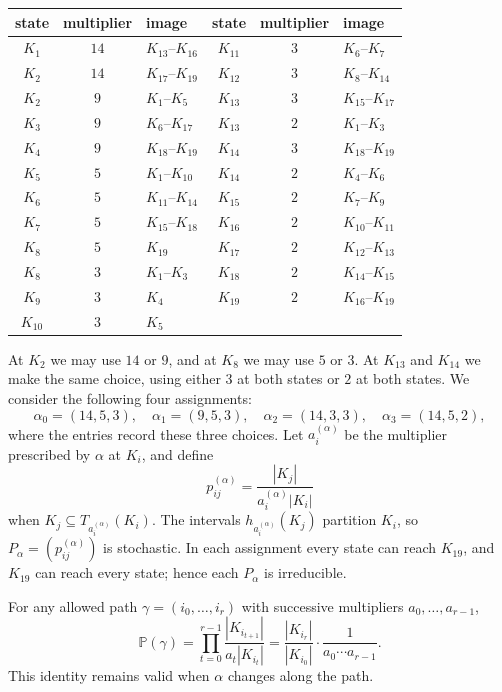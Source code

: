 \documentclass[11pt]{article}
\begin{document}
\begin{center}
\small
\begin{tabular}{ccl@{\qquad}ccl}
\toprule
state & multiplier & image & state & multiplier & image \\
\midrule
$K_1$ & $14$ & $K_{13}\text{--}K_{16}$ & $K_{11}$ & $3$ & $K_6\text{--}K_7$ \\
$K_2$ & $14$ & $K_{17}\text{--}K_{19}$ & $K_{12}$ & $3$ & $K_8\text{--}K_{14}$ \\
$K_2$ & $9$ & $K_1\text{--}K_5$ & $K_{13}$ & $3$ & $K_{15}\text{--}K_{17}$ \\
$K_3$ & $9$ & $K_6\text{--}K_{17}$ & $K_{13}$ & $2$ & $K_1\text{--}K_3$ \\
$K_4$ & $9$ & $K_{18}\text{--}K_{19}$ & $K_{14}$ & $3$ & $K_{18}\text{--}K_{19}$ \\
$K_5$ & $5$ & $K_1\text{--}K_{10}$ & $K_{14}$ & $2$ & $K_4\text{--}K_6$ \\
$K_6$ & $5$ & $K_{11}\text{--}K_{14}$ & $K_{15}$ & $2$ & $K_7\text{--}K_9$ \\
$K_7$ & $5$ & $K_{15}\text{--}K_{18}$ & $K_{16}$ & $2$ & $K_{10}\text{--}K_{11}$ \\
$K_8$ & $5$ & $K_{19}$ & $K_{17}$ & $2$ & $K_{12}\text{--}K_{13}$ \\
$K_8$ & $3$ & $K_1\text{--}K_3$ & $K_{18}$ & $2$ & $K_{14}\text{--}K_{15}$ \\
$K_9$ & $3$ & $K_4$ & $K_{19}$ & $2$ & $K_{16}\text{--}K_{19}$ \\
$K_{10}$ & $3$ & $K_5$ & & & \\
\bottomrule
\end{tabular}
\end{center}

At $K_2$ we may use $14$ or $9$, and at $K_8$ we may use $5$ or $3$. At $K_{13}$ and $K_{14}$ we make the same choice, using either $3$ at both states or $2$ at both states. We consider the following four assignments:
\[
\alpha_0=(14,5,3),\quad
\alpha_1=(9,5,3),\quad
\alpha_2=(14,3,3),\quad
\alpha_3=(14,5,2),
\]
where the entries record these three choices. Let $a_i^{(\alpha)}$ be the multiplier prescribed by $\alpha$ at $K_i$, and define
\[
p_{ij}^{(\alpha)}=\frac{|K_j|}{a_i^{(\alpha)}|K_i|}
\]
when $K_j\subseteq T_{a_i^{(\alpha)}}(K_i)$. The intervals $h_{a_i^{(\alpha)}}(K_j)$ partition $K_i$, so $P_\alpha=(p_{ij}^{(\alpha)})$ is stochastic. In each assignment every state can reach $K_{19}$, and $K_{19}$ can reach every state; hence each $P_\alpha$ is irreducible.

For any allowed path $\gamma=(i_0,\ldots,i_r)$ with successive multipliers $a_0,\ldots,a_{r-1}$,
\begin{equation}\label{eq:telescope}
\mathbb P(\gamma)
=\prod_{t=0}^{r-1}\frac{|K_{i_{t+1}}|}{a_t|K_{i_t}|}
=\frac{|K_{i_r}|}{|K_{i_0}|}\cdot\frac1{a_0\cdots a_{r-1}}.
\end{equation}
This identity remains valid when $\alpha$ changes along the path.
\end{document}
